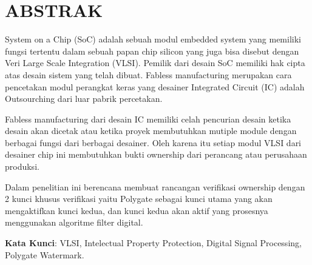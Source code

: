 \chapter*{ABSTRAK}

\noindent System on a Chip (SoC) adalah sebuah modul embedded system yang
memiliki fungsi tertentu dalam sebuah papan chip silicon yang juga bisa disebut
dengan Veri Large Scale Integration (VLSI). Pemilik dari desain SoC memiliki
hak cipta atas desain sistem yang telah dibuat. Fabless manufacturing merupakan
cara pencetakan modul perangkat keras yang desainer Integrated Circuit (IC)
adalah Outsourching dari luar pabrik percetakan.

\vspace*{0.5cm}
\noindent Fabless manufacturing dari desain IC memiliki celah pencurian desain
ketika desain akan dicetak atau ketika proyek membutuhkan mutiple module
dengan berbagai fungsi dari berbagai desainer. Oleh karena itu setiap modul VLSI
dari desainer chip ini membutuhkan bukti ownership dari perancang atau
perusahaan produksi.

\vspace*{0.5cm}
\noindent Dalam penelitian ini berencana membuat rancangan verifikasi ownership
dengan 2 kunci khusus verifikasi yaitu Polygate sebagai kunci utama yang akan
mengaktifkan kunci kedua, dan kunci kedua akan aktif yang prosesnya
menggunakan algoritme filter digital.

\vspace*{0.2cm}

\noindent \textbf{Kata Kunci}: VLSI, Intelectual Property Protection, Digital Signal Processing, Polygate Watermark.

\newpage